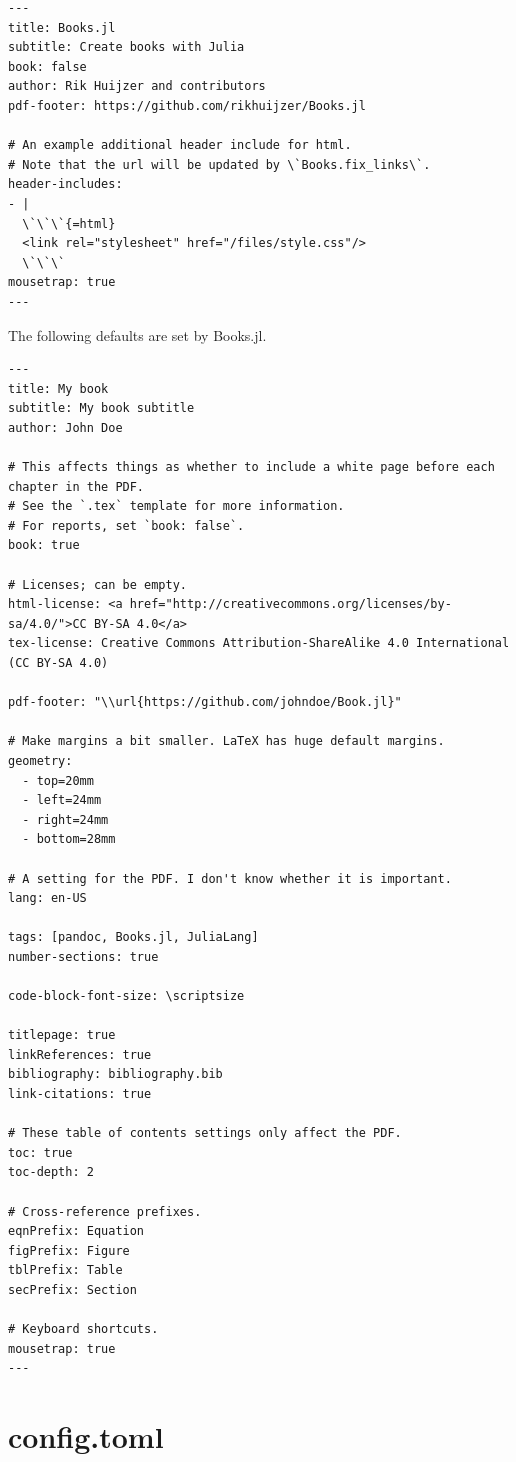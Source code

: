 \documentclass[
  14pt
  american,
  paper=a4,
  ,captions=tableheading
]{scrreprt}
\begin{document}
\begin{lstlisting}
---
title: Books.jl
subtitle: Create books with Julia
book: false
author: Rik Huijzer and contributors
pdf-footer: https://github.com/rikhuijzer/Books.jl

# An example additional header include for html.
# Note that the url will be updated by \`Books.fix_links\`.
header-includes:
- |
  \`\`\`{=html}
  <link rel="stylesheet" href="/files/style.css"/>
  \`\`\`
mousetrap: true
---
\end{lstlisting}

The following defaults are set by Books.jl.

\begin{lstlisting}
---
title: My book
subtitle: My book subtitle
author: John Doe

# This affects things as whether to include a white page before each chapter in the PDF.
# See the `.tex` template for more information.
# For reports, set `book: false`.
book: true

# Licenses; can be empty.
html-license: <a href="http://creativecommons.org/licenses/by-sa/4.0/">CC BY-SA 4.0</a>
tex-license: Creative Commons Attribution-ShareAlike 4.0 International (CC BY-SA 4.0)

pdf-footer: "\\url{https://github.com/johndoe/Book.jl}"

# Make margins a bit smaller. LaTeX has huge default margins.
geometry:
  - top=20mm
  - left=24mm
  - right=24mm
  - bottom=28mm

# A setting for the PDF. I don't know whether it is important.
lang: en-US

tags: [pandoc, Books.jl, JuliaLang]
number-sections: true

code-block-font-size: \scriptsize

titlepage: true
linkReferences: true
bibliography: bibliography.bib
link-citations: true

# These table of contents settings only affect the PDF.
toc: true
toc-depth: 2

# Cross-reference prefixes.
eqnPrefix: Equation
figPrefix: Figure
tblPrefix: Table
secPrefix: Section

# Keyboard shortcuts.
mousetrap: true
---
\end{lstlisting}

\hypertarget{sec:config}{%
\section{config.toml}\label{sec:config}}
\end{document}
